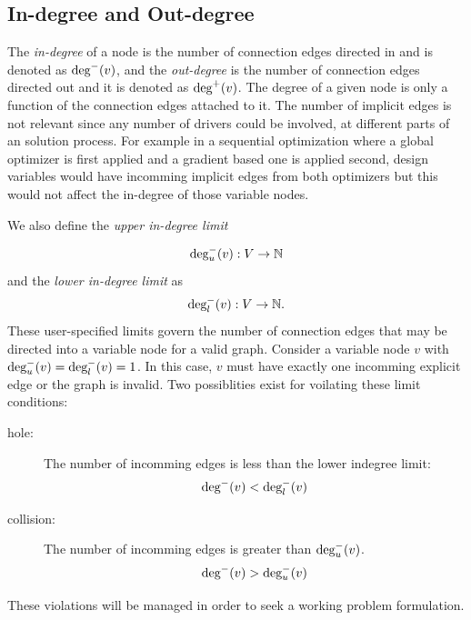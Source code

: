 \subsection{In-degree and Out-degree}
\label{s:indegree-outdegree}
The \emph{in-degree} of a node is the number of connection edges directed in and 
is denoted as $\textrm{deg}^-(v)$, and the \emph{out-degree} 
is the number of connection edges directed out and it is denoted as $\textrm{deg}^+(v)$.
The degree of a given node is only a function of the connection edges 
attached to it. The number of implicit edges is not relevant since any number 
of drivers could be involved, at different parts of an solution process. For 
example in a sequential optimization where a global optimizer is first applied
and a gradient based one is applied second, design variables would have incomming 
implicit edges from both optimizers but this would not affect the in-degree of those
variable nodes. 

We also define the \emph{upper in-degree limit} 

\begin{equation}
\textrm{deg}_u^-(v):V \to \mathbb{N}
\end{equation} 
and the \emph{lower in-degree limit} as
\begin{equation}
\textrm{deg}_l^-(v):V \to \mathbb{N}.
\end{equation}
These user-specified limits govern the number of connection edges that may be directed into a variable
node for a valid graph. Consider a variable node $v$ with
$\textrm{deg}_u^-(v) = \textrm{deg}_l^-(v) = 1$. In this case, $v$ must have exactly one
incomming explicit edge or the graph is invalid. Two possiblities exist for voilating 
these limit conditions: 
\begin{description}
  \item[hole: ] The number of incomming edges is less than the lower indegree limit:
    \begin{equation} \textrm{deg}^-(v) < \textrm{deg}_l^-(v) \label{e:hole} \end{equation} 

  \item[collision: ] The number of incomming edges is greater than $ \textrm{deg}_u^-(v)$. 
    \begin{equation} \textrm{deg}^-(v) > \textrm{deg}_u^-(v) \label{e:collision} \end{equation}
\end{description} 
These violations will be managed in order to seek a working problem formulation.

